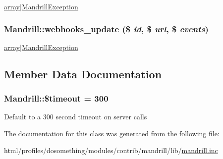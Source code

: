 \label{classMandrill_a021fbb76c0635e5e97ecac14d65e72a6}
\hyperlink{}{array$|$MandrillException }\hypertarget{classMandrill_a90e6aec9588217c12f054e50ecee95ca}{
\subsubsection[{webhooks\_\-update}]{\setlength{\rightskip}{0pt plus 5cm}Mandrill::webhooks\_\-update (\$ {\em id}, \/  \$ {\em url}, \/  \$ {\em events})}}
\label{classMandrill_a90e6aec9588217c12f054e50ecee95ca}
\hyperlink{}{array$|$MandrillException }

\subsection{Member Data Documentation}
\hypertarget{classMandrill_ad122e3798f29ec32036cbe9d1f6f223c}{
\subsubsection[{\$timeout}]{\setlength{\rightskip}{0pt plus 5cm}Mandrill::\$timeout = 300}}
\label{classMandrill_ad122e3798f29ec32036cbe9d1f6f223c}
Default to a 300 second timeout on server calls 

The documentation for this class was generated from the following file:\begin{DoxyCompactItemize}
\item 
html/profiles/dosomething/modules/contrib/mandrill/lib/\hyperlink{mandrill_8inc}{mandrill.inc}\end{DoxyCompactItemize}
